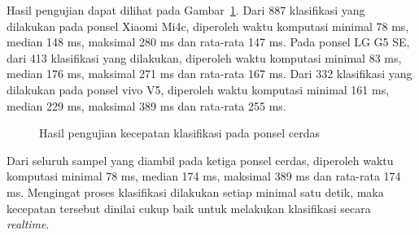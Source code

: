 Hasil pengujian dapat dilihat pada Gambar~\ref{gambar:hasil-kecepatan}. Dari 887 klasifikasi yang dilakukan pada ponsel Xiaomi Mi4c, diperoleh waktu komputasi minimal 78 ms, median 148 ms, maksimal 280 ms dan rata-rata 147 ms. Pada ponsel LG G5 SE, dari 413 klasifikasi yang dilakukan, diperoleh waktu komputasi minimal 83 ms, median 176 ms, maksimal 271 ms dan rata-rata 167 ms. Dari 332 klasifikasi yang dilakukan pada ponsel vivo V5, diperoleh waktu komputasi minimal 161 ms, median 229 ms, maksimal 389 ms dan rata-rata 255 ms.

\begin{figure}[h!]
    \caption{Hasil pengujian kecepatan klasifikasi pada ponsel cerdas}
    \label{gambar:hasil-kecepatan}
\end{figure}

Dari seluruh sampel yang diambil pada ketiga ponsel cerdas, diperoleh waktu komputasi minimal 78 ms, median 174 ms, maksimal 389 ms dan rata-rata 174 ms. Mengingat proses klasifikasi dilakukan setiap minimal satu detik, maka kecepatan tersebut dinilai cukup baik untuk melakukan klasifikasi secara \textit{realtime}.

